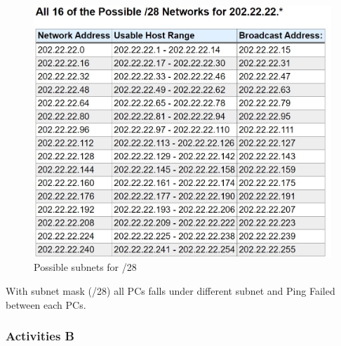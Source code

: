 \documentclass[a4paper,11pt]{article}
\begin{document}
\begin{enumerate}
          \begin{figure}[H]
              \centering
              \includegraphics[scale=0.8,cframe=blue 0.5pt 3pt]{./FIG/A28.jpg}
              \caption{Possible subnets for /28 }
          \end{figure}

          With subnet mask  (/28) all PCs falls under different subnet and Ping Failed between each PCs.

\end{enumerate}

\pagebreak
%
%
%
%
%
%
%
%


\subsubsection{Activities B}
\end{document}
